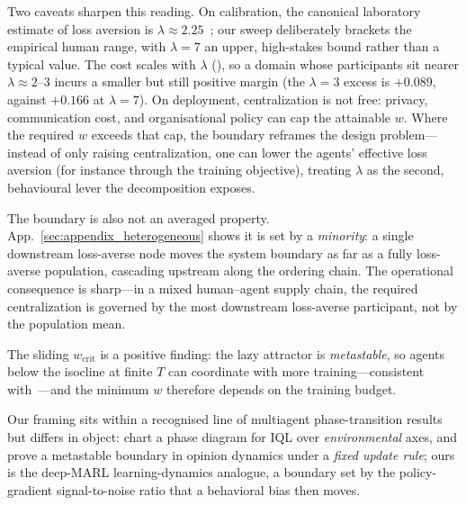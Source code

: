 \documentclass[letterpaper]{article}
\theoremstyle{plain}
\newcommand{\wcrit}{w_{\mathrm{crit}}}
\begin{document}
Two caveats sharpen this reading. On calibration, the canonical laboratory
estimate of loss aversion is $\lambda\approx2.25$~\citep{tversky1992}; our
sweep deliberately brackets the empirical human range, with $\lambda{=}7$ an
upper, high-stakes bound rather than a typical value. The cost scales with
$\lambda$ (), so a domain whose participants sit nearer
$\lambda\approx2$--$3$ incurs a smaller but still positive margin (the
$\lambda{=}3$ excess is $+0.089$, against $+0.166$ at $\lambda{=}7$). On
deployment, centralization is not free: privacy, communication cost, and
organisational policy can cap the attainable $w$. Where the required $w$
exceeds that cap, the boundary reframes the design problem---instead of only
raising centralization, one can lower the agents' effective loss aversion
(for instance through the training objective), treating $\lambda$ as the
second, behavioural lever the decomposition exposes.

The boundary is also not an averaged property. App.~\ref{sec:appendix_heterogeneous}
shows it is set by a \emph{minority}: a single downstream loss-averse node
moves the system boundary as far as a fully loss-averse population, cascading
upstream along the ordering chain. The operational consequence is sharp---in a
mixed human--agent supply chain, the required centralization is governed by the
most downstream loss-averse participant, not by the population mean.

The sliding $\wcrit$ is a positive finding: the lazy attractor is
\emph{metastable}, so agents below the isocline at finite $T$ can coordinate with
more training---consistent with~\citet{weng2026}---and the minimum $w$ therefore
depends on the training budget.

Our framing sits within a recognised line of multiagent phase-transition results
but differs in object: \citet{yamaguchi2025} chart a phase diagram for IQL over
\emph{environmental} axes, and \citet{capannoli2026phase} prove a metastable
boundary in opinion dynamics under a \emph{fixed update rule}; ours is the
deep-MARL learning-dynamics analogue, a boundary set by the policy-gradient
signal-to-noise ratio that a behavioral bias then moves.
\end{document}
